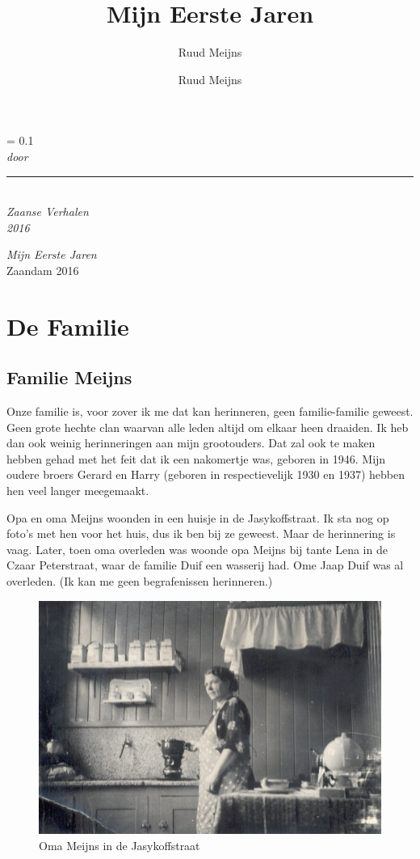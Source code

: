 \documentclass[12pt,twoside]{memoir}
\author{Ruud Meijns}
\author{Ruud Meijns}
\title{Mijn Eerste Jaren}
\date{}
\newlength{\drop}%
\newcommand*{\titleS}{\begingroup%
\drop = 0.1\textheight
\centering
\vspace*{\drop}
{\Huge \thetitle}\\[\baselineskip]
{\large\itshape door \theauthor}\\[\baselineskip]
\vfill
\rule{0.4\textwidth}{0.4pt}\\[\baselineskip]
{\large\itshape Zaanse Verhalen \\[0.5cm] 2016}\par
\vspace*{\drop}
\endgroup}
\begin{document}
\pagestyle{plain}
\let\cleardoublepage\clearpage
\thispagestyle{empty}
\titleS




\frontmatter

\null\vfill
\thispagestyle{empty}
\begin{flushleft}
\textit{Mijn Eerste Jaren}\\
\vfil
Zaandam 
2016


\end{flushleft}
\let\cleardoublepage\clearpage
\clearpage
\setcounter{tocdepth}{-1}
\tableofcontents
\thispagestyle{empty}
\clearpage

\mainmatter
\sloppy

\part{De Familie}
\thispagestyle{empty}
\chapter{Familie Meijns} %
\label{cha:familie_meijns}

Onze familie is, voor zover ik me dat kan herinneren, geen familie-familie geweest. Geen grote hechte clan waarvan alle leden altijd om elkaar heen draaiden. Ik heb dan ook weinig herinneringen aan mijn grootouders. Dat zal ook te maken hebben gehad met het feit dat ik een nakomertje was, geboren in 1946. Mijn oudere broers Gerard en Harry (geboren in respectievelijk 1930 en 1937) hebben hen veel langer meegemaakt. 

Opa en oma Meijns woonden in een huisje in de Jasykoffstraat. Ik sta nog op foto’s met hen voor het huis, dus ik ben bij ze geweest. Maar de herinnering is vaag. Later, toen oma overleden was woonde opa Meijns bij tante Lena in de Czaar Peterstraat, waar de familie Duif een wasserij had. Ome Jaap Duif was al overleden. (Ik kan me geen begrafenissen herinneren.)

\begin{figure}
\includegraphics[width=\textwidth]{img/ch1/omaJasykofstr}
\caption*{\footnotesize Oma Meijns in de Jasykoffstraat}
\end{figure}
\end{document}
